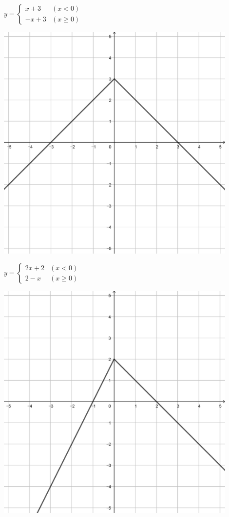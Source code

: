 \documentclass[a4paper]{oblivoir}
\begin{document}
\clearpage
\begin{minipage}{0.45\textwidth}\centering
\(y=\begin{cases}x+3&(x<0)\\-x+3&(x\ge0)\end{cases}\)
\par\bigskip\includegraphics[width=0.9\textwidth]{img/12-1}
\end{minipage}
\begin{minipage}{0.45\textwidth}\centering
\(y=\begin{cases}2x+2&(x<0)\\2-x&(x\ge0)\end{cases}\)
\par\bigskip\includegraphics[width=0.9\textwidth]{img/12-2}
\end{minipage}\bigskip\bigskip\par
\end{document}

